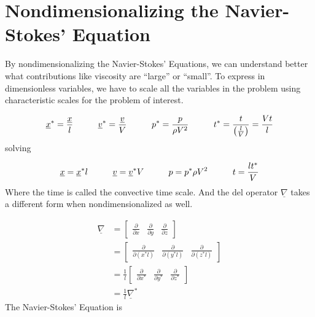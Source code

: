 \section{Nondimensionalizing the Navier-Stokes' Equation}

By nondimensionalizing the Navier-Stokes' Equations, we can understand better what contributions like viscosity are ``large'' or ``small''.
To express in dimensionless variables, we have to scale all the variables in the problem using characteristic scales for the problem of interest.

\begin{equation*}
  \underline{x}^{*}=\frac{\underline{x}}{l}
  \hspace{0.4in}
  \underline{v}^{*}=\frac{\underline{v}}{V}
  \hspace{0.4in}
  p^{*}=\frac{p}{\rho{}V^{2}}
  \hspace{0.4in}
  t^{*}=\frac{t}{\left(\frac{l}{V}\right)}=\frac{Vt}{l}
\end{equation*}
solving

\begin{equation*}
  \underline{x}=\underline{x}^{*}l
  \hspace{0.4in}
  \underline{v}=\underline{v}^{*}V
  \hspace{0.4in}
  p=p^{*}\rho{}V^{2}
  \hspace{0.4in}
  t=\frac{lt^{*}}{V}
\end{equation*}
Where the time is called the convective time scale.
And the del operator $\underline{\nabla}$ takes a different form when nondimensionalized as well.

\begin{equation*}
  \begin{split}
    \underline{\nabla}&=
    \begin{bmatrix}
    \frac{\partial}{\partial{}x} &
    \frac{\partial}{\partial{}y} &
    \frac{\partial}{\partial{}z}
    \end{bmatrix} \\
    &=
    \begin{bmatrix}
    \frac{\partial}{\partial(x^{*}l)} &
    \frac{\partial}{\partial(y^{*}l)} &
    \frac{\partial}{\partial(z^{*}l)}
    \end{bmatrix} \\
    &=
    \frac{1}{l}
    \begin{bmatrix}
    \frac{\partial}{\partial{}x^{*}} &
    \frac{\partial}{\partial{}y^{*}} &
    \frac{\partial}{\partial{}z^{*}}
    \end{bmatrix} \\
    &=\frac{1}{l}\underline{\nabla}^{*}
  \end{split}
\end{equation*}
The Navier-Stokes' Equation is

